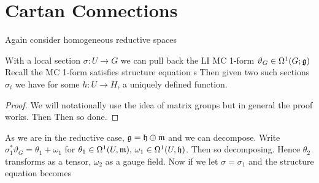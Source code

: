 \documentclass{article}
\begin{document}
\section{Cartan Connections}
Again consider homogeneous reductive spaces 
\begin{center}
\end{center}
With a local section $\sigma : U \to G$ we can pull back the LI MC 1-form $\vartheta_G \in \Omega^1(G;\mathfrak{g})$
Recall the MC 1-form satisfies structure equation s
Then given two such sections $\sigma_i$ we have 
for some $h:U \to H$, a uniquely defined function. 
\begin{lemma}
\end{lemma}
\begin{proof}
We will notationally use the idea of matrix groups but in general the proof works. Then 
Then 
so done. 
\end{proof}
As we are in the reductive case, $\mathfrak{g} = \mathfrak{h} \oplus \mathfrak{m}$ and we can decompose. Write $\sigma_1^\ast \vartheta_G = \theta_1 + \omega_1 $ for $\theta_1 \in \Omega^1(U,\mathfrak{m}), \, \omega_1 \in \Omega^1(U,\mathfrak{h})$. Then 
so 
decomposing. Hence $\theta_2$ transforms as a tensor, $\omega_2$ as a gauge field. Now if we let $\sigma = \sigma_1$ and the structure equation becomes 
\end{document}
